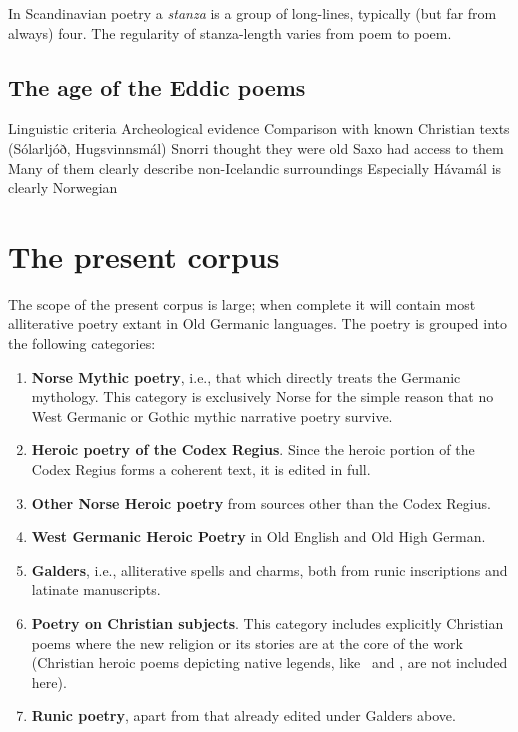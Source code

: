     In Scandinavian poetry a \emph{stanza} is a group of long-lines, typically (but far from always) four.  The regularity of stanza-length varies from poem to poem.


  \subsection{The age of the Eddic poems}%
    Linguistic criteria
    Archeological evidence
    Comparison with known Christian texts (Sólarljóð, Hugsvinnsmál)
    Snorri thought they were old
    Saxo had access to them
    Many of them clearly describe non-Icelandic surroundings
      Especially Hávamál is clearly Norwegian


\section{The present corpus}
  The scope of the present corpus is large; when complete it will contain most alliterative poetry extant in Old Germanic languages.  The poetry is grouped into the following categories:
  \begin{enumerate}
    \item \textbf{Norse Mythic poetry}, i.e., that which directly treats the Germanic mythology.  This category is exclusively Norse for the simple reason that no West Germanic or Gothic mythic narrative poetry survive.
    \item \textbf{Heroic poetry of the Codex Regius}.  Since the heroic portion of the Codex Regius forms a coherent text, it is edited in full.
    \item \textbf{Other Norse Heroic poetry} from sources other than the Codex Regius.
    \item \textbf{West Germanic Heroic Poetry} in Old English and Old High German.
    \item \textbf{Galders}, i.e., alliterative spells and charms, both from runic inscriptions and latinate manuscripts.
    \item \textbf{Poetry on Christian subjects}.  This category includes explicitly Christian poems where the new religion or its stories are at the core of the work (Christian heroic poems depicting native legends, like \Beowulf\ and \Hildebrandslied, are not included here).
    \item \textbf{Runic poetry}, apart from that already edited under Galders above.
  \end{enumerate}

